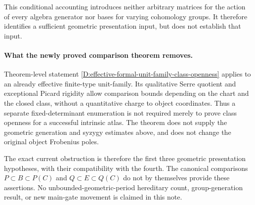 This conditional accounting introduces neither arbitrary matrices for the
action of every algebra generator nor bases for varying cohomology groups.
It therefore identifies a sufficient geometric presentation input, but
does not establish that input.

\paragraph{What the newly proved comparison theorem removes.}
Theorem-level statement
\ref{D:effective-formal-unit-family-class-openness} applies to an already
effective finite-type unit-family.  Its qualitative Serre quotient and
exceptional Picard rigidity allow comparison bounds depending on the chart
and the closed class, without a quantitative charge to object coordinates.
Thus a separate fixed-determinant enumeration is not required merely to
prove class openness for a successful intrinsic atlas.  The theorem does
not supply the geometric generation and syzygy estimates above, and does
not change the original object Frobenius poles.

The exact current obstruction is therefore the first three geometric
presentation hypotheses, with their compatibility with the fourth.  The
canonical comparisons $P\subset B\subset P(C)$ and
$Q\subset E\subset Q(C)$ do not by themselves provide these assertions.
No unbounded-geometric-period hereditary count, group-generation result,
or new main-gate movement is claimed in this note.
